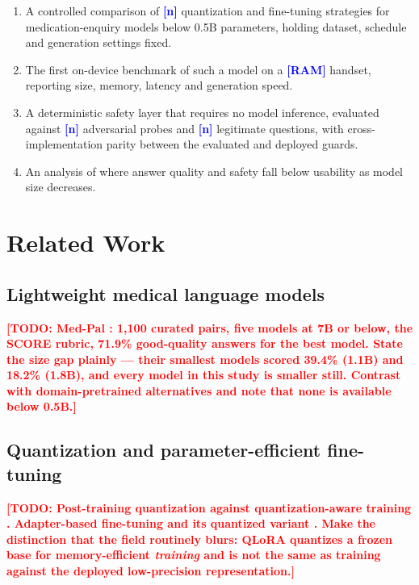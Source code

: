 \documentclass[10pt,twocolumn]{article}
\newcommand{\TODO}[1]{\textcolor{red}{\textbf{[TODO: #1]}}}
\newcommand{\NUM}[1]{\textcolor{blue}{\textbf{[#1]}}}
\begin{document}
\begin{enumerate}\itemsep2pt
  \item A controlled comparison of \NUM{n} quantization and fine-tuning
        strategies for medication-enquiry models below 0.5B parameters,
        holding dataset, schedule and generation settings fixed.
  \item The first on-device benchmark of such a model on a \NUM{RAM} handset,
        reporting size, memory, latency and generation speed.
  \item A deterministic safety layer that requires no model inference,
        evaluated against \NUM{n} adversarial probes and \NUM{n} legitimate
        questions, with cross-implementation parity between the evaluated and
        deployed guards.
  \item An analysis of where answer quality and safety fall below usability as
        model size decreases.
\end{enumerate}

\section{Related Work}

\subsection{Lightweight medical language models}
\TODO{Med-Pal \citep{elangovan2025medpal}: 1,100 curated pairs, five models at
7B or below, the SCORE rubric, 71.9\% good-quality answers for the best model.
State the size gap plainly --- their smallest models scored 39.4\% (1.1B) and
18.2\% (1.8B), and every model in this study is smaller still. Contrast with
domain-pretrained alternatives \citep{labrak2024biomistral,kim2025meerkat} and
note that none is available below 0.5B.}

\subsection{Quantization and parameter-efficient fine-tuning}
\TODO{Post-training quantization \citep{frantar2023gptq,lin2024awq} against
quantization-aware training \citep{jacob2018quantization,nagel2021whitepaper}.
Adapter-based fine-tuning \citep{hu2022lora} and its quantized variant
\citep{dettmers2023qlora}. Make the distinction that the field routinely
blurs: QLoRA quantizes a frozen base for memory-efficient \emph{training} and
is not the same as training against the deployed low-precision representation.}
\end{document}
